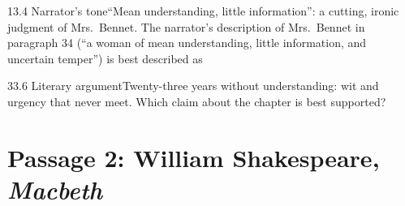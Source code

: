 \documentclass[11pt]{article}
\begin{document}
\begin{q}{1}{3.4 Narrator's tone}{``Mean understanding, little information'': a cutting, ironic judgment of Mrs.\ Bennet.}
The narrator's description of Mrs.\ Bennet in paragraph 34 (``a woman of mean understanding, little information, and uncertain temper'') is best described as
\end{q}

\begin{q}{3}{3.6 Literary argument}{Twenty-three years without understanding: wit and urgency that never meet.}
Which claim about the chapter is best supported?
\end{q}

\section{Passage 2: William Shakespeare, \emph{Macbeth}}
\end{document}
